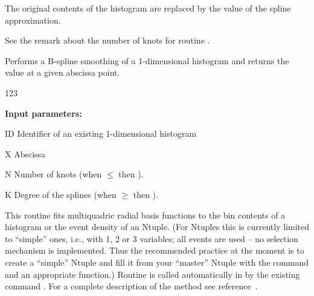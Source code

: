 \Remark
\begin{UL}
\item The original contents of the histogram are replaced by the value of the
spline approximation.
\item See the remark about the number of knots for routine .
\end{UL}
 
 
\Action
Performs a  B-spline smoothing of a 1-dimensional histogram
and returns the value at a given abscissa point.
 
\begin{DLtt}{123}
\item[{\rm\bf Input parameters:}]
\item[ID] Identifier of an existing 1-dimensional histogram
\item[X] Abscissa
\item[N] Number of knots (when \(\le\) then ).
\item[K] Degree of the splines (when \(\ge\) then ).
\end{DLtt}
 
\label{sec:HQUAD}

\Action This routine fits multiquadric radial basis functions to the bin contents of a
histogram or the event density of an Ntuple.
(For Ntuples this is currently limited to ``simple'' ones, i.e., with 1, 2 or 3
variables; all events are used -- no selection mechanism is implemented.  Thus
the recommended practice at the moment is to create a ``simple'' Ntuple and
fill it from your ``master'' Ntuple with the  command and an
appropriate  function.)
Routine  is called automatically 
in \PAW{} by the existing command .
For a complete description of the method see reference~\cite{bib-Allison2}.


